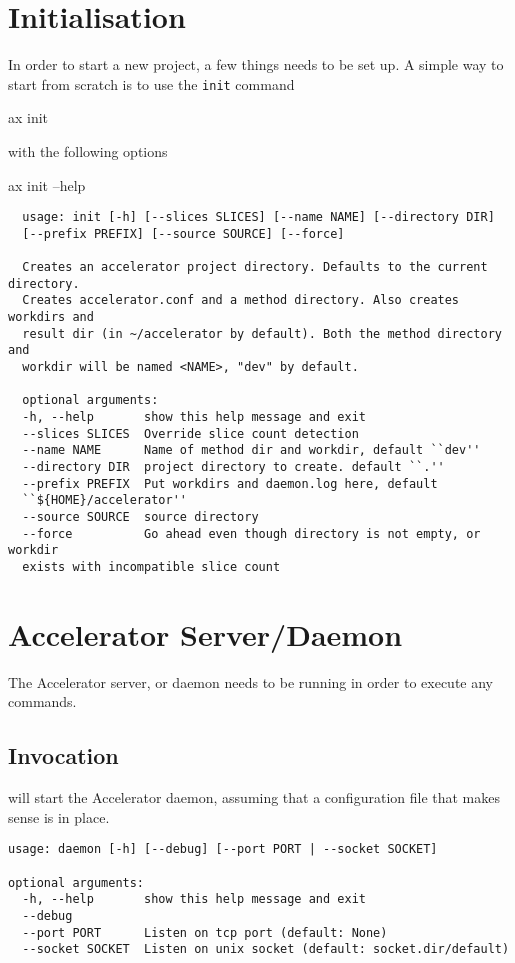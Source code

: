 \section{Initialisation}
In order to start a new project, a few things needs to be set up.  A
simple way to start from scratch is to use the \texttt{init} command
\begin{shell}
  ax init
\end{shell}
with the following options
\begin{shell}
  ax init --help
\end{shell}
\begin{snugshade}
\begin{verbatim}
  usage: init [-h] [--slices SLICES] [--name NAME] [--directory DIR]
  [--prefix PREFIX] [--source SOURCE] [--force]

  Creates an accelerator project directory. Defaults to the current directory.
  Creates accelerator.conf and a method directory. Also creates workdirs and
  result dir (in ~/accelerator by default). Both the method directory and
  workdir will be named <NAME>, "dev" by default.

  optional arguments:
  -h, --help       show this help message and exit
  --slices SLICES  Override slice count detection
  --name NAME      Name of method dir and workdir, default ``dev''
  --directory DIR  project directory to create. default ``.''
  --prefix PREFIX  Put workdirs and daemon.log here, default
  ``${HOME}/accelerator''
  --source SOURCE  source directory
  --force          Go ahead even though directory is not empty, or workdir
  exists with incompatible slice count
\end{verbatim}
\end{snugshade}




\section{Accelerator Server/Daemon}

The Accelerator server, or daemon needs to be running in order to
execute any commands.

\subsection{Invocation}
\begin{shell}
\end{shell}
will start the Accelerator daemon, assuming that a configuration file
that makes sense is in place.
\begin{shell}
\end{shell}
\begin{snugshade}
\begin{verbatim}
usage: daemon [-h] [--debug] [--port PORT | --socket SOCKET]

optional arguments:
  -h, --help       show this help message and exit
  --debug
  --port PORT      Listen on tcp port (default: None)
  --socket SOCKET  Listen on unix socket (default: socket.dir/default)
\end{verbatim}%
\end{snugshade}

